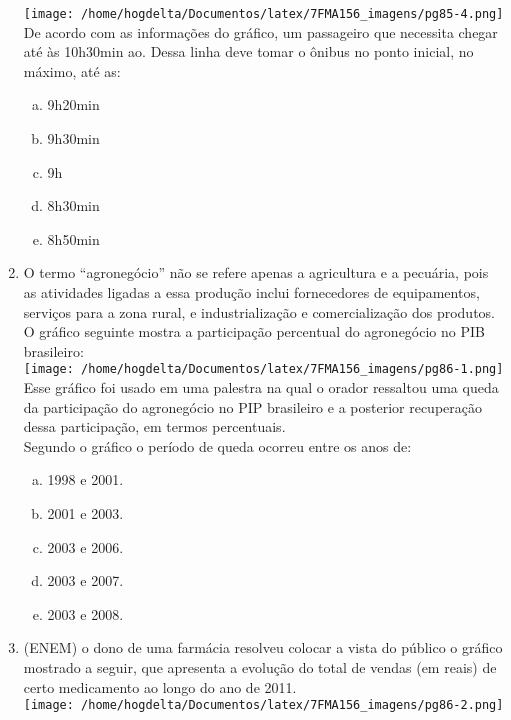 \documentclass[a4paper,14pt]{article}
\begin{document}
\begin{multicols}{2}
\begin{enumerate}
	        \texttt{[image: /home/hogdelta/Documentos/latex/7FMA156\_imagens/pg85-4.png]}
	        De acordo com as informações do gráfico, um passageiro que necessita chegar até às 10h30min ao. Dessa linha deve tomar o ônibus no ponto inicial, no máximo, até as:
	        \begin{enumerate}[a)]
	        	\item 9h20min
	        	\item 9h30min
	        	\item 9h
	        	\item 8h30min
	        	\item 8h50min
	        \end{enumerate}
            \item O termo “agronegócio” não se refere apenas a agricultura e a pecuária, pois as atividades ligadas a essa produção inclui fornecedores de equipamentos, serviços para a zona rural, e industrialização e comercialização dos produtos. O gráfico seguinte mostra a participação percentual do agronegócio no PIB brasileiro: \\
            \texttt{[image: /home/hogdelta/Documentos/latex/7FMA156\_imagens/pg86-1.png]} \\
            Esse gráfico foi usado em uma palestra na qual o orador ressaltou uma queda da participação do agronegócio no PIP brasileiro e a posterior recuperação dessa participação, em termos percentuais. \\
            Segundo o gráfico o período de queda ocorreu entre os anos de: \\
            \begin{enumerate}[a)]
            	\item 1998 e 2001.
            	\item 2001 e 2003.
            	\item 2003 e 2006.
            	\item 2003 e 2007.
            	\item 2003 e 2008.
            \end{enumerate}
            \item (ENEM) o dono de uma farmácia resolveu colocar a vista do público o gráfico mostrado a seguir, que apresenta a evolução do total de vendas (em reais) de certo medicamento ao longo do ano de 2011. \\
            \texttt{[image: /home/hogdelta/Documentos/latex/7FMA156\_imagens/pg86-2.png]} \\

\end{enumerate}
\end{multicols}
\end{document}
